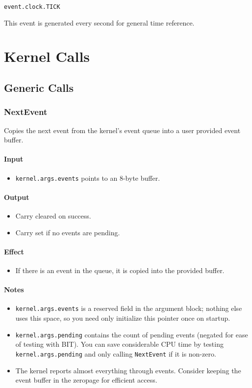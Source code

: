 \begin{verbatim}
event.clock.TICK
\end{verbatim}

This event is generated every second for general time reference.


\section*{Kernel Calls}

\subsection*{Generic Calls}

\subsubsection*{NextEvent}
Copies the next event from the kernel's event queue into a user provided event buffer.

\paragraph{Input}
\begin{itemize}
\item \verb+kernel.args.events+ points to an 8-byte buffer.  
\end{itemize}

\paragraph{Output}
\begin{itemize}
\item Carry cleared on success.
\item Carry set if no events are pending.
\end{itemize}

\paragraph{Effect}
\begin{itemize}
\item If there is an event in the queue, it is copied into the provided buffer.
\end{itemize}

\paragraph{Notes}
\begin{itemize}
\item \verb+kernel.args.events+ is a reserved field in the argument block; nothing else uses this space, so you need only initialize this pointer once on startup.
\item \verb+kernel.args.pending+ contains the count of pending events (negated for ease of testing with BIT).  You can save considerable CPU time by testing \verb+kernel.args.pending+ and only calling \verb+NextEvent+ if it is non-zero.
\item The kernel reports almost everything through events.  Consider keeping the event buffer in the zeropage for efficient access.
\end{itemize}


